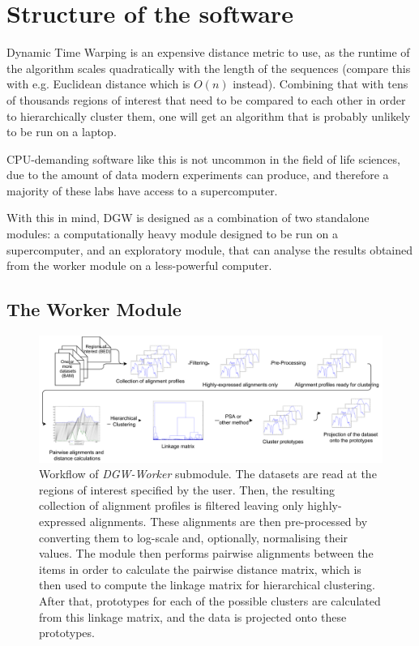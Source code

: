 \documentclass[parskip]{cs4rep}
\begin{document}
\section{Structure of the software}
Dynamic Time Warping is an expensive distance metric to use, as the runtime of the algorithm scales quadratically with the length of the sequences (compare this with e.g. Euclidean distance which is $O(n)$ instead). Combining that with tens of thousands regions of interest that need to be compared to each other in order to hierarchically cluster them, one will get an algorithm that is probably unlikely to be run on a laptop. 

CPU-demanding software like this is not uncommon in the field of life sciences, due to the amount of data modern experiments can produce, and therefore a majority of these labs have access to a supercomputer.

With this in mind, DGW is designed as a combination of two standalone modules: a computationally heavy module designed to be run on a supercomputer, and an exploratory module, that can analyse the results obtained from the worker module on a less-powerful computer.

\subsection{The Worker Module}
\begin{figure}
    \centering
    \includegraphics[width=1.1\textwidth]{figures/implementation/DGW-worker-workflow.pdf}
    \caption{Workflow of \emph{DGW-Worker} submodule. The datasets are read at the regions of interest specified by the user. Then, the resulting collection of alignment profiles is filtered leaving only highly-expressed alignments. These alignments are then pre-processed by converting them to log-scale and, optionally, normalising their values. The module then performs pairwise alignments between the items in order to calculate the pairwise distance matrix, which is then used to compute the linkage matrix for hierarchical clustering. After that, prototypes for each of the possible clusters are calculated from this linkage matrix, and the data is projected onto these prototypes.}
    \label{fig:implementation:dgw-worker-workflow}
\end{figure}
\end{document}
